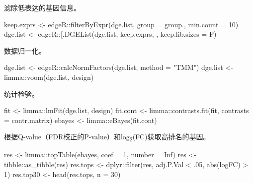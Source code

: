 \documentclass[
]{article}
\newenvironment{Shaded}{\begin{snugshade}}{\end{snugshade}}
\newcommand{\AttributeTok}[1]{\textcolor[rgb]{0.77,0.63,0.00}{#1}}
\newcommand{\ConstantTok}[1]{\textcolor[rgb]{0.00,0.00,0.00}{#1}}
\newcommand{\DecValTok}[1]{\textcolor[rgb]{0.00,0.00,0.81}{#1}}
\newcommand{\FunctionTok}[1]{\textcolor[rgb]{0.00,0.00,0.00}{#1}}
\newcommand{\NormalTok}[1]{#1}
\newcommand{\OtherTok}[1]{\textcolor[rgb]{0.56,0.35,0.01}{#1}}
\newcommand{\SpecialCharTok}[1]{\textcolor[rgb]{0.00,0.00,0.00}{#1}}
\newcommand{\StringTok}[1]{\textcolor[rgb]{0.31,0.60,0.02}{#1}}
\begin{document}
滤除低表达的基因信息。

\begin{Shaded}
\begin{Highlighting}[]
\NormalTok{keep.exprs }\OtherTok{\textless{}{-}}\NormalTok{ edgeR}\SpecialCharTok{::}\FunctionTok{filterByExpr}\NormalTok{(dge.list, }\AttributeTok{group =}\NormalTok{ group., }\AttributeTok{min.count =} \DecValTok{10}\NormalTok{)}
\NormalTok{dge.list }\OtherTok{\textless{}{-}}\NormalTok{ edgeR}\SpecialCharTok{::}\StringTok{\textasciigrave{}}\AttributeTok{[.DGEList}\StringTok{\textasciigrave{}}\NormalTok{(dge.list, keep.exprs, , }\AttributeTok{keep.lib.sizes =}\NormalTok{ F)}
\end{Highlighting}
\end{Shaded}

数据归一化。

\begin{Shaded}
\begin{Highlighting}[]
\NormalTok{dge.list }\OtherTok{\textless{}{-}}\NormalTok{ edgeR}\SpecialCharTok{::}\FunctionTok{calcNormFactors}\NormalTok{(dge.list, }\AttributeTok{method =} \StringTok{"TMM"}\NormalTok{)}
\NormalTok{dge.list }\OtherTok{\textless{}{-}}\NormalTok{ limma}\SpecialCharTok{::}\FunctionTok{voom}\NormalTok{(dge.list, design)}
\end{Highlighting}
\end{Shaded}

统计检验。

\begin{Shaded}
\begin{Highlighting}[]
\NormalTok{fit }\OtherTok{\textless{}{-}}\NormalTok{ limma}\SpecialCharTok{::}\FunctionTok{lmFit}\NormalTok{(dge.list, design)}
\NormalTok{fit.cont }\OtherTok{\textless{}{-}}\NormalTok{ limma}\SpecialCharTok{::}\FunctionTok{contrasts.fit}\NormalTok{(fit, }\AttributeTok{contrasts =}\NormalTok{ contr.matrix)}
\NormalTok{ebayes }\OtherTok{\textless{}{-}}\NormalTok{ limma}\SpecialCharTok{::}\FunctionTok{eBayes}\NormalTok{(fit.cont)}
\end{Highlighting}
\end{Shaded}

根据Q-value（FDR校正的P-value）和log\textsubscript{2}(FC)获取高排名的基因。

\begin{Shaded}
\begin{Highlighting}[]
\NormalTok{res }\OtherTok{\textless{}{-}}\NormalTok{ limma}\SpecialCharTok{::}\FunctionTok{topTable}\NormalTok{(ebayes, }\AttributeTok{coef =} \DecValTok{1}\NormalTok{, }\AttributeTok{number =} \ConstantTok{Inf}\NormalTok{)}
\NormalTok{res }\OtherTok{\textless{}{-}}\NormalTok{ tibble}\SpecialCharTok{::}\FunctionTok{as\_tibble}\NormalTok{(res)}
\NormalTok{res.tops }\OtherTok{\textless{}{-}}\NormalTok{ dplyr}\SpecialCharTok{::}\FunctionTok{filter}\NormalTok{(res, adj.P.Val }\SpecialCharTok{\textless{}}\NormalTok{ .}\DecValTok{05}\NormalTok{, }\FunctionTok{abs}\NormalTok{(logFC) }\SpecialCharTok{\textgreater{}} \DecValTok{1}\NormalTok{)}
\NormalTok{res.top30 }\OtherTok{\textless{}{-}} \FunctionTok{head}\NormalTok{(res.tops, }\AttributeTok{n =} \DecValTok{30}\NormalTok{)}
\end{Highlighting}
\end{Shaded}
\end{document}
